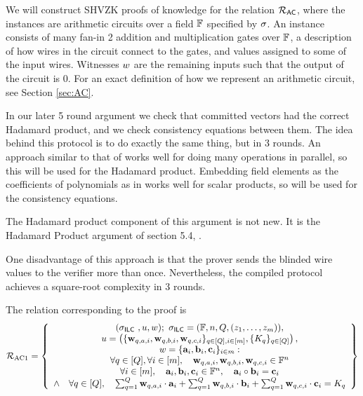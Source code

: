 We will construct SHVZK proofs of knowledge for the relation $\mathcal{R}_{\mathsf{AC}}$, where the instances are arithmetic circuits over a field $\mathbb{F}$ specified by $\mathsf{\sigma}$. An instance consists of many fan-in 2 addition and multiplication gates over $\mathbb{F}$, a description of how wires in the circuit connect to the gates, and values assigned to some of the input wires. Witnesses $w$ are the remaining inputs such that the output of the circuit is $0$. For an exact definition of how we represent an arithmetic circuit, see Section \ref{sec:AC}.

In our later 5 round argument we check that committed vectors had the correct Hadamard product, and we check consistency equations between them. The idea behind this protocol is to do exactly the same thing, but in 3 rounds. An approach similar to that of \cite{PHGR13} works well for doing many operations in parallel, so this will be used for the Hadamard product. Embedding field elements as the coefficients of polynomials as in \cite{Groth2009b} works well for scalar products, so will be used for the consistency equations.

The Hadamard product component of this argument is not new. It is the Hadamard Product argument of section 5.4, \cite{Bayer2014}.

One disadvantage of this approach is that the prover sends the blinded wire values to the verifier more than once. Nevertheless, the compiled protocol achieves a square-root complexity in 3 rounds.

The relation corresponding to the proof is
\[
\mathcal{R}_{\textnormal{AC1}}=\left\{\begin{array}{c}
(\mathsf{\sigma}_{\mathsf{ILC}~},u,w); \ \mathsf{\sigma}_{\mathsf{ILC}} = (\mathbb{F},n,Q,(z_1,\ldots,z_m)), \\
u = \left( \{\mathbf{w}_{q,{a,i}},\mathbf{w}_{q,{b,i}},\mathbf{w}_{q,{c,i}}\}_{q \in [Q], i \in [m]}, \{K_{q}\}_{q \in [Q]}\right), \\
w = \{\mathbf{a}_i,\mathbf{b}_i,\mathbf{c}_i\}_{i \in m}:\\
\forall q \in [Q], \forall i \in [m], \quad \mathbf{w}_{q,a,i}, \mathbf{w}_{q,b,i}, \mathbf{w}_{q,c,i} \in \mathbb{F}^n \\
\forall i \in [m], \quad \mathbf{a}_i,\mathbf{b}_i,\mathbf{c}_i \in \mathbb{F}^n, \quad \mathbf{a}_i \circ \mathbf{b}_i=\mathbf{c}_i \\
\wedge \quad \forall q \in [Q], \quad \sum_{q=1}^Q \mathbf{w}_{q,a,i} \cdot \mathbf{a}_i + \sum_{q=1}^Q \mathbf{w}_{q,b,i} \cdot \mathbf{b}_i + \sum_{q=1}^Q \mathbf{w}_{q,c,i} \cdot \mathbf{c}_i = K_q
\end{array}\right\}
\]

